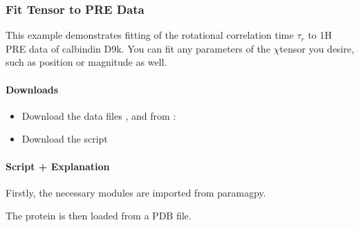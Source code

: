 \documentclass[a4paper,10pt,english,openany,oneside]{sphinxmanual}
\begin{document}
\subsubsection{Fit Tensor to PRE Data}
\label{\detokenize{examples/pre_fit_proton:fit-tensor-to-pre-data}}\label{\detokenize{examples/pre_fit_proton:pre-fit-proton}}\label{\detokenize{examples/pre_fit_proton::doc}}
\sphinxAtStartPar
This example demonstrates fitting of the rotational correlation time \({\tau_r}\) to 1H PRE data of calbindin D9k. You can fit any parameters of the \({\chi}\)\sphinxhyphen{}tensor you desire, such as position or magnitude as well.


\paragraph{Downloads}
\label{\detokenize{examples/pre_fit_proton:downloads}}\begin{itemize}
\item {} 
\sphinxAtStartPar
Download the data files ,  and  from :

\item {} 
\sphinxAtStartPar
Download the script 

\end{itemize}


\paragraph{Script + Explanation}
\label{\detokenize{examples/pre_fit_proton:script-explanation}}
\sphinxAtStartPar
Firstly, the necessary modules are imported from paramagpy.

\begin{sphinxVerbatim}[commandchars=\\\{\}]
      
\end{sphinxVerbatim}

\sphinxAtStartPar
The protein is then loaded from a PDB file.

\begin{sphinxVerbatim}[commandchars=\\\{\}]
  
\end{sphinxVerbatim}
\end{document}
